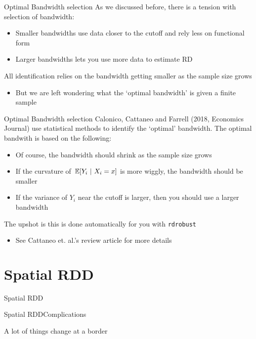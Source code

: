 \documentclass[aspectratio=169,t,11pt,table]{beamer}
\begin{document}
\begin{frame}{Optimal Bandwidth selection}
  As we discussed before, there is a tension with selection of bandwidth:
  \begin{itemize}
    \item Smaller bandwidths use data closer to the cutoff and rely less on functional form
    
    \item Larger bandwidths lets you use more data to estimate RD
  \end{itemize}

  All identification relies on the bandwidth getting smaller as the sample size grows
  \begin{itemize}
    \item But we are left wondering what the `optimal bandwidth' is given a finite sample
  \end{itemize}
\end{frame}


\begin{frame}{Optimal Bandwidth selection}
  Calonico, Cattaneo and Farrell (2018, Economics Journal) use statistical methods to identify the `optimal' bandwidth. The optimal bandwith is based on the following:
  \begin{itemize}
    \item Of course, the bandwidth should shrink as the sample size grows

    \item If the curvature of $\expec{Y_i}{X_i = x}$ is more wiggly, the bandwidth should be smaller

    \item If the variance of $Y_i$ near the cutoff is larger, then you should use a larger bandwidth
  \end{itemize}

  \pause
  \bigskip 
  The upshot is this is done automatically for you with \texttt{rdrobust}
  \begin{itemize}
    \item See Cattaneo et. al.'s review article for more details
  \end{itemize}
\end{frame}



\section{Spatial RDD}
\begin{frame}{Spatial RDD}{}

\end{frame}

\begin{frame}{Spatial RDD}{Complications}

\end{frame}

\begin{frame}{A lot of things change at a border}{}

\end{frame}
\end{document}
